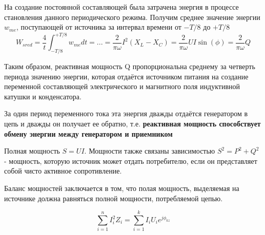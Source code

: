 На создание постоянной составляющей была затрачена энергия в процессе становления данного периодического режима. 
Получим среднее значение энергии $w_{me}$, поступающей от источника за интервал времени от $-T/8$ до $+T/8$
$$
W_{sred} = \frac{4}{t}\int_{-T/8}^{+T/8} w_{me}dt = ... = \frac{2}{\pi \omega}I^2(X_L - X_C) =\frac{2}{\pi \omega} UI\sin(\phi) = \frac{2}{\pi \omega} Q 
$$

Таким образом, реактивная мощность Q пропорциональна среднему за четверть периода значению энергии, которая отдаётся источником питания на создание переменной составляющей электрического и магнитного поля индуктивной катушки и конденсатора.

За один период переменного тока эта энергия дважды отдаётся генератором в цепь и дважды он получает ее обратно, т.е. {\bfseries реактивная мощность способствует обмену энергии между генератором и приемником} 

Полная мощность
$S=UI$. Мощности также связаны зависимостью $S^2 = P^2 + Q^2$ - мощность, которую источник может отдать потребителю, если он представляет собой чисто активное сопротивление.


Баланс мощностей заключается в том, что полая мощность, выделяемая на источнике должна равняться полной мощности, потребляемой цепью.

\begin{equation}
\sum_{i=1}^n I_i^2 Z_i = \sum_{i=1}^k I_i U_i e^{j \phi_{kz}}
\end{equation} 


\pagebreak
